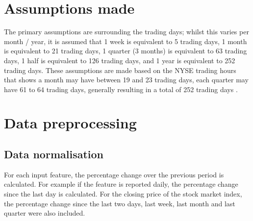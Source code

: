 \section{Assumptions made}
The primary assumptions are surrounding the trading days; whilst this varies per month / year, it is assumed
that 1 week is equivalent to 5 trading days, 1 month is equivalent to 21 trading days, 1 quarter (3 months)
is equivalent to 63 trading days, 1 half is equivalent to 126 trading days, and 1 year is equivalent to 252
trading days. These assumptions are made based on the NYSE trading hours that shows a month may have
between 19 and 23 trading days, each quarter may have 61 to 64 trading days, generally resulting in a total
of 252 trading days \parencite{nyse_2020}.

\section{Data preprocessing}
\subsection{Data normalisation}
For each input feature, the percentage change over the previous period is calculated. For example if the feature
is reported daily, the percentage change since the last day is calculated. For the closing price of the stock
market index, the percentage change since the last two days, last week, last month and last quarter were also
included.

